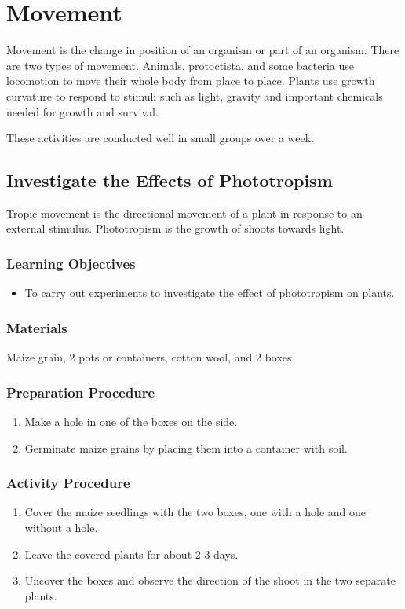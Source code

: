 \section{Movement}
Movement is the change in position of an organism or part of an organism. There are two types of movement. Animals, protoctista, and some bacteria use locomotion to move their whole body from place to place. Plants use growth curvature to respond to stimuli such as light, gravity and important chemicals needed for growth and survival.

These activities are conducted well in small groups over a week. 

\subsection{Investigate the Effects of Phototropism}
Tropic movement is the directional movement of a plant in response to an external stimulus. Phototropism is the growth of shoots towards light.

\subsubsection*{Learning Objectives}
\begin{itemize}
\item{To carry out experiments to investigate the effect of phototropism on plants.}
\end{itemize}

\subsubsection*{Materials}
Maize grain, 2 pots or containers, cotton wool, and 2 boxes

\subsubsection*{Preparation Procedure}
\begin{enumerate}
\item{Make a hole in one of the boxes on the side.}
\item{Germinate maize grains by placing them into a container with soil.}
\end{enumerate}

\subsubsection*{Activity Procedure}
\begin{enumerate}
\item{Cover the maize seedlings with the two boxes, one with a hole and one without a hole.}
\item{Leave the covered plants for about 2-3 days.}
\item{Uncover the boxes and observe the direction of the shoot in the two separate plants.}
\end{enumerate}

